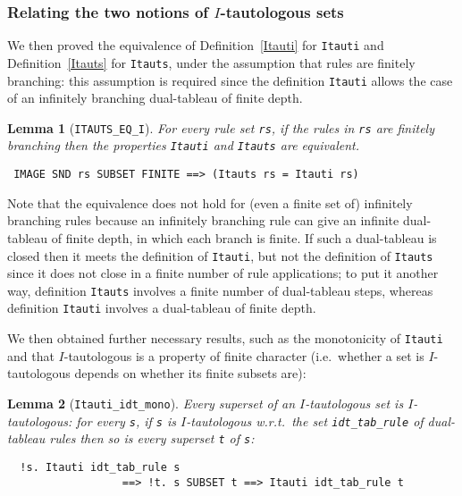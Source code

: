 \documentclass[a4paper]{article}
\newtheorem{lemma}{Lemma}
\begin{document}
\subsubsection{Relating the two notions of $I$-tautologous sets}

We then proved the equivalence of 
Definition~\ref{Itauti} for \texttt{Itauti} and
Definition~\ref{Itauts} for \texttt{Itauts},
under the assumption that rules are finitely branching:
this assumption is required since the definition \texttt{Itauti}
allows the case of an infinitely branching dual-tableau of finite depth.

\begin{lemma}[\texttt{ITAUTS\_EQ\_I}] \label{ITAUTS-EQ-I}
For every rule set \texttt{rs},
if the rules in \texttt{rs} are finitely branching then
the properties \texttt{Itauti} and \texttt{Itauts} are equivalent.
\end{lemma}
\begin{verbatim}
 IMAGE SND rs SUBSET FINITE ==> (Itauts rs = Itauti rs)
\end{verbatim}
  
Note that the equivalence does not hold for (even a finite set of)
infinitely branching rules because an infinitely branching rule can
give an infinite dual-tableau of finite depth, in which each branch is
finite.  If such a dual-tableau is closed then it meets the definition of
\texttt{Itauti}, but not the definition of \texttt{Itauts} since it
does not close in a finite number of rule applications; to put it
another way, definition \texttt{Itauts} involves a finite number of
dual-tableau steps, whereas definition \texttt{Itauti} involves a dual-tableau
of finite depth.

We then obtained further necessary results, such as the monotonicity
of \texttt{Itauti} and that $I$-tautologous is a property of finite
character (i.e.\ whether a set is $I$-tautologous depends on whether its
finite subsets are):

\begin{lemma}[\texttt{Itauti\_idt\_mono}] \label{Itauti-idt-mono}
  Every superset of an $I$-tautologous set is $I$-tautologous: for every
  \texttt{s}, if \texttt{s} is $I$-tautologous w.r.t.\ the set
  \texttt{idt\_tab\_rule} of dual-tableau rules then so is every
  superset \texttt{t} of \texttt{s}:
\end{lemma}
\begin{verbatim}
  !s. Itauti idt_tab_rule s 
                  ==> !t. s SUBSET t ==> Itauti idt_tab_rule t
\end{verbatim}
\end{document}
